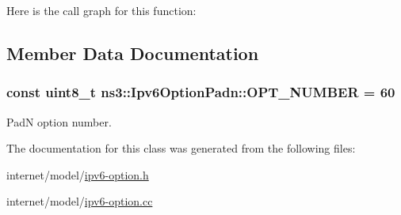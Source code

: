 Here is the call graph for this function\+:




\subsection{Member Data Documentation}
\subsubsection[{\texorpdfstring{O\+P\+T\+\_\+\+N\+U\+M\+B\+ER}{OPT_NUMBER}}]{\setlength{\rightskip}{0pt plus 5cm}const uint8\+\_\+t ns3\+::\+Ipv6\+Option\+Padn\+::\+O\+P\+T\+\_\+\+N\+U\+M\+B\+ER = 60\hspace{0.3cm}{\ttfamily [static]}}\hypertarget{classns3_1_1Ipv6OptionPadn_a480007975c0029f13fee179d8a106a79}{}\label{classns3_1_1Ipv6OptionPadn_a480007975c0029f13fee179d8a106a79}


PadN option number. 



The documentation for this class was generated from the following files\+:\begin{DoxyCompactItemize}
\item 
internet/model/\hyperlink{ipv6-option_8h}{ipv6-\/option.\+h}\item 
internet/model/\hyperlink{ipv6-option_8cc}{ipv6-\/option.\+cc}\end{DoxyCompactItemize}
